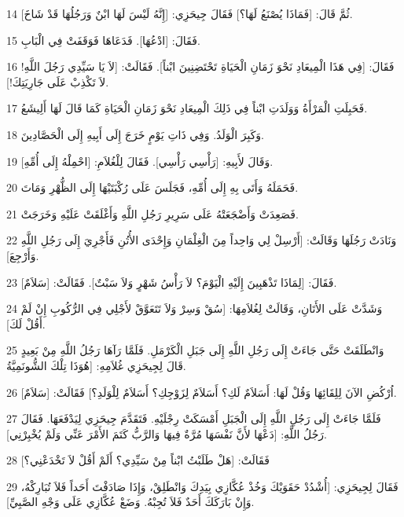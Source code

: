 \par 14 ثُمَّ قَالَ: [فَمَاذَا يُصْنَعُ لَهَا؟] فَقَالَ جِيحَزِي: [إِنَّهُ لَيْسَ لَهَا ابْنٌ وَرَجُلُهَا قَدْ شَاخَ].
\par 15 فَقَالَ: [ادْعُهَا]. فَدَعَاهَا فَوَقَفَتْ فِي الْبَابِ.
\par 16 فَقَالَ: [فِي هَذَا الْمِيعَادِ نَحْوَ زَمَانِ الْحَيَاةِ تَحْتَضِنِينَ ابْناً]. فَقَالَتْ: [لاَ يَا سَيِّدِي رَجُلَ اللَّهِ! لاَ تَكْذِبْ عَلَى جَارِيَتِكَ!].
\par 17 فَحَبِلَتِ الْمَرْأَةُ وَوَلَدَتِ ابْناً فِي ذَلِكَ الْمِيعَادِ نَحْوَ زَمَانِ الْحَيَاةِ كَمَا قَالَ لَهَا أَلِيشَعُ.
\par 18 وَكَبِرَ الْوَلَدُ. وَفِي ذَاتِ يَوْمٍ خَرَجَ إِلَى أَبِيهِ إِلَى الْحَصَّادِينَ.
\par 19 وَقَالَ لأَبِيهِ: [رَأْسِي رَأْسِي]. فَقَالَ لِلْغُلاَمِ: [احْمِلْهُ إِلَى أُمِّهِ].
\par 20 فَحَمَلَهُ وَأَتَى بِهِ إِلَى أُمِّهِ، فَجَلَسَ عَلَى رُكْبَتَيْهَا إِلَى الظُّهْرِ وَمَاتَ.
\par 21 فَصَعِدَتْ وَأَضْجَعَتْهُ عَلَى سَرِيرِ رَجُلِ اللَّهِ وَأَغْلَقَتْ عَلَيْهِ وَخَرَجَتْ.
\par 22 وَنَادَتْ رَجُلَهَا وَقَالَتْ: [أَرْسِلْ لِي وَاحِداً مِنَ الْغِلْمَانِ وَإِحْدَى الأُتُنِ فَأَجْرِيَ إِلَى رَجُلِ اللَّهِ وَأَرْجِعَ].
\par 23 فَقَالَ: [لِمَاذَا تَذْهَبِينَ إِلَيْهِ الْيَوْمَ؟ لاَ رَأْسُ شَهْرٍ وَلاَ سَبْتٌ]. فَقَالَتْ: [سَلاَمٌ].
\par 24 وَشَدَّتْ عَلَى الأَتَانِ، وَقَالَتْ لِغُلاَمِهَا: [سُقْ وَسِرْ وَلاَ تَتَعَوَّقْ لأَجْلِي فِي الرُّكُوبِ إِنْ لَمْ أَقُلْ لَكَ].
\par 25 وَانْطَلَقَتْ حَتَّى جَاءَتْ إِلَى رَجُلِ اللَّهِ إِلَى جَبَلِ الْكَرْمَلِ. فَلَمَّا رَآهَا رَجُلُ اللَّهِ مِنْ بَعِيدٍ قَالَ لِجِيحَزِي غُلاَمِهِ: [هُوَذَا تِلْكَ الشُّونَمِيَّةُ.
\par 26 اُرْكُضِ الآنَ لِلِقَائِهَا وَقُلْ لَهَا: أَسَلاَمٌ لَكِ؟ أَسَلاَمٌ لِزَوْجِكِ؟ أَسَلاَمٌ لِلْوَلَدِ؟] فَقَالَتْ: [سَلاَمٌ].
\par 27 فَلَمَّا جَاءَتْ إِلَى رَجُلِ اللَّهِ إِلَى الْجَبَلِ أَمْسَكَتْ رِجْلَيْهِ. فَتَقَدَّمَ جِيحَزِي لِيَدْفَعَهَا. فَقَالَ رَجُلُ اللَّهِ: [دَعْهَا لأَنَّ نَفْسَهَا مُرَّةٌ فِيهَا وَالرَّبُّ كَتَمَ الأَمْرَ عَنِّي وَلَمْ يُخْبِرْنِي].
\par 28 فَقَالَتْ: [هَلْ طَلَبْتُ ابْناً مِنْ سَيِّدِي؟ أَلَمْ أَقُلْ لاَ تَخْدَعْنِي؟]
\par 29 فَقَالَ لِجِيحَزِي: [أُشْدُدْ حَقَوَيْكَ وَخُذْ عُكَّازِي بِيَدِكَ وَانْطَلِقْ، وَإِذَا صَادَفْتَ أَحَداً فَلاَ تُبَارِكْهُ، وَإِنْ بَارَكَكَ أَحَدٌ فَلاَ تُجِبْهُ. وَضَعْ عُكَّازِي عَلَى وَجْهِ الصَّبِيِّ].

